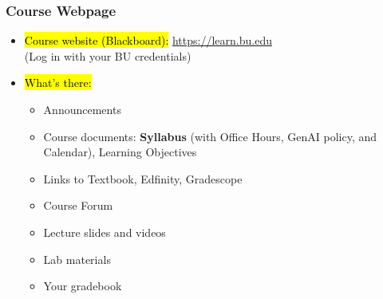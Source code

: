 \documentclass[slidestop,compress,mathserif]{beamer}
\begin{document}

\begin{frame}
	\frametitle{Course Webpage} 
	\begin{itemize}
		\item \hl{Course website (Blackboard):} \url{https://learn.bu.edu} \\
		(Log in with your BU credentials)
		\item \hl{What's there:}
		\begin{itemize}
			\item Announcements
			\item Course documents: \textbf{Syllabus} (with Office Hours, GenAI policy, and Calendar), Learning Objectives
			\item Links to Textbook, Edfinity, Gradescope
			\item Course Forum
			\item Lecture slides and videos
			\item Lab materials
			\item Your gradebook
		\end{itemize}
	\end{itemize}	
\end{frame}

\end{document}
